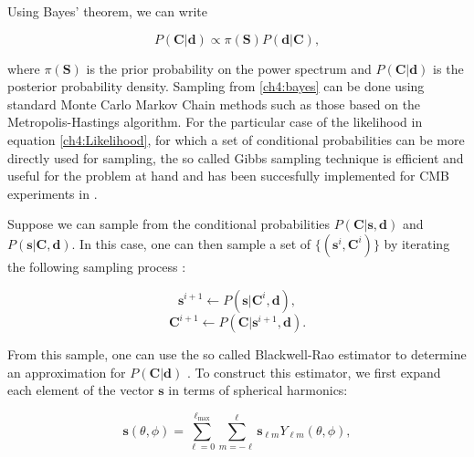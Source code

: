 \documentclass[openany,a4paper,12pt,oneside]{book}
\begin{document}
\begin{spacing}{1.5}
Using Bayes' theorem, we can write

\begin{equation}\label{ch4:bayes}
  P(\mathbf{C}|\mathbf{d})\propto \pi(\mathbf{S})P(\mathbf{d}|\mathbf{C}),
\end{equation}

\noindent where $\pi(\mathbf{S})$ is the prior probability on the power spectrum and $P(\mathbf{C}|\mathbf{d})$ is the posterior probability density. Sampling from \eqref{ch4:bayes} can be done using standard Monte Carlo Markov Chain methods such as those based on the Metropolis-Hastings algorithm. For the particular case of the likelihood in equation \eqref{ch4:Likelihood}, for which a set of conditional probabilities can be more directly used for sampling, the so called Gibbs sampling technique is efficient and useful for the problem at hand and has been succesfully implemented for CMB experiments in \cite{Jewell_2004,Eriksen_2004,Wandelt_2004, Larson_2007}. 

Suppose we can sample from the conditional probabilities $P(\mathbf{C}|\mathbf{s}, \mathbf{d})$ and $P(\mathbf{s}|\mathbf{C}, \mathbf{d})$. In this case, one can then sample a set of $\{(\mathbf{s}^i, \mathbf{C}^i)\}$ by iterating the following sampling process \cite{Chu_2005}:

\begin{equation}\label{gibbs_sample1}
\mathbf{s}^{i+1}\leftarrow P(\mathbf{s}|\mathbf{C}^i, \mathbf{d}),
\end{equation}
\begin{equation}\label{gibbs_sample2}
\mathbf{C}^{i+1}\leftarrow P(\mathbf{C}|\mathbf{s}^{i+1}, \mathbf{d}).
\end{equation}

From this sample, one can use the so called Blackwell-Rao estimator to determine an approximation for $P(\mathbf{C}|\mathbf{d})$ \cite{Chu_2005}. To construct this estimator, we first expand each element of the vector $\mathbf{s}$ in terms of spherical harmonics:


\begin{equation}\label{s_harmonics}
	\mathbf{s}(\theta, \phi)=\sum_{\ell=0}^{\ell_\text{max}} \sum_{m=-\ell}^\ell \mathbf{s}_{\ell m}Y_{\ell m}(\theta, \phi),
\end{equation}


\end{spacing}
\end{document}
